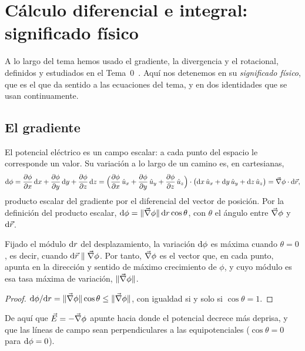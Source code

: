 \clearpage
\appendix
\section{Cálculo diferencial e integral: significado físico}\label{app:calculo}
A lo largo del tema hemos usado el gradiente, la divergencia y el rotacional, definidos y estudiados en el Tema~0~\cite{TEMA0}. Aquí nos detenemos en su \emph{significado físico}, que es el que
da sentido a las ecuaciones del tema, y en dos identidades que se usan continuamente.

\subsection{El gradiente}\label{app:gradiente}
El potencial eléctrico es un campo escalar: a cada punto del espacio le corresponde un valor. Su variación a lo largo de un camino es, en cartesianas,
\[
  \mathrm{d}\phi=\frac{\partial \phi}{\partial x}\,\mathrm{d} x+\frac{\partial \phi}{\partial y}\,\mathrm{d} y+\frac{\partial \phi}{\partial z}\,\mathrm{d} z=\Bigl(\frac{\partial \phi}{\partial x}\,\hat{u}_{x}+\frac{\partial \phi}{\partial y}\,\hat{u}_{y}+\frac{\partial \phi}{\partial z}\,\hat{u}_{z}\Bigr)\cdot\bigl(\mathrm{d} x\,\hat{u}_{x}+\mathrm{d} y\,\hat{u}_{y}+\mathrm{d} z\,\hat{u}_{z}\bigr)=\vec{\nabla}\phi\cdot\mathrm{d}\vec{r},
\]
producto escalar del gradiente por el diferencial del vector de posición. Por la definición del producto escalar, $\mathrm{d}\phi=\lVert \vec{\nabla}\phi\rVert\,\mathrm{d} r\cos\theta$, con $\theta$ el ángulo entre $\vec{\nabla}\phi$ y $\mathrm{d}\vec{r}$.

\begin{proposicion}\label{prop:grad-maximo}
Fijado el módulo $\mathrm{d} r$ del desplazamiento, la variación $\mathrm{d}\phi$ es máxima cuando $\theta=0$, es decir, cuando $\mathrm{d}\vec{r}\parallel\vec{\nabla}\phi$. Por tanto, $\vec{\nabla}\phi$ es el vector que, en cada punto, apunta en la dirección y sentido de máximo crecimiento de
$\phi$, y cuyo módulo es esa tasa máxima de variación, $\lVert \vec{\nabla}\phi\rVert$.
\end{proposicion}
\begin{proof}
$\mathrm{d}\phi/\mathrm{d} r=\lVert \vec{\nabla}\phi\rVert\cos\theta\le\lVert \vec{\nabla}\phi\rVert$, con igualdad si y solo si $\cos\theta=1$.
\end{proof}
De aquí que $\vec{E}=-\vec{\nabla}\phi$ apunte hacia donde el potencial decrece más deprisa, y que las líneas de campo sean perpendiculares a las equipotenciales ($\cos\theta=0$ para $\mathrm{d}\phi=0$).

